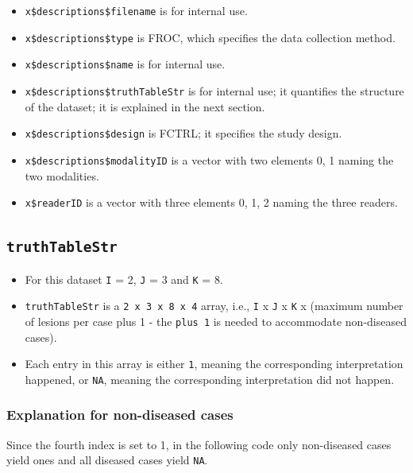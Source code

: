 \documentclass[
]{book}
\providecommand{\tightlist}{%
  \setlength{\itemsep}{0pt}\setlength{\parskip}{0pt}}
\begin{document}
\begin{itemize}
\tightlist
\item
  \texttt{x\$descriptions\$filename} is for internal use.
\item
  \texttt{x\$descriptions\$type} is FROC, which specifies the data collection method.
\item
  \texttt{x\$descriptions\$name} is for internal use.
\item
  \texttt{x\$descriptions\$truthTableStr} is for internal use; it quantifies the structure of the dataset; it is explained in the next section.
\item
  \texttt{x\$descriptions\$design} is FCTRL; it specifies the study design.
\item
  \texttt{x\$descriptions\$modalityID} is a vector with two elements 0, 1 naming the two modalities.
\item
  \texttt{x\$readerID} is a vector with three elements 0, 1, 2 naming the three readers.
\end{itemize}

\hypertarget{dataset-object-truth-table-str}{%
\subsection{\texorpdfstring{\texttt{truthTableStr}}{truthTableStr}}\label{dataset-object-truth-table-str}}

\begin{itemize}
\tightlist
\item
  For this dataset \texttt{I} = 2, \texttt{J} = 3 and \texttt{K} = 8.
\item
  \texttt{truthTableStr} is a \texttt{2\ x\ 3\ x\ 8\ x\ 4} array, i.e., \texttt{I} x \texttt{J} x \texttt{K} x (maximum number of lesions per case plus 1 - the \texttt{plus\ 1} is needed to accommodate non-diseased cases).
\item
  Each entry in this array is either \texttt{1}, meaning the corresponding interpretation happened, or \texttt{NA}, meaning the corresponding interpretation did not happen.
\end{itemize}

\hypertarget{explanation-for-non-diseased-cases}{%
\subsubsection{Explanation for non-diseased cases}\label{explanation-for-non-diseased-cases}}

Since the fourth index is set to 1, in the following code only non-diseased cases yield ones and all diseased cases yield \texttt{NA}.
\end{document}
